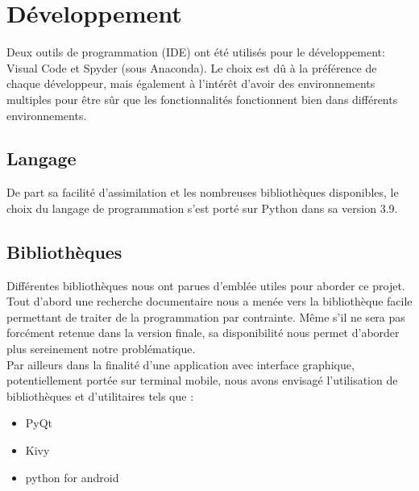 \section{Développement}

Deux outils de programmation (IDE) ont été utilisés pour le développement: Visual Code et Spyder 
(sous Anaconda). Le choix est dû à la préférence de chaque développeur, mais également à l'intérêt 
d’avoir des environnements multiples pour être sûr que les fonctionnalités fonctionnent bien dans différents 
environnements.


\subsection{Langage}

De part sa facilité d'assimilation et les nombreuses bibliothèques disponibles, le choix du langage de programmation
s'est porté sur Python dans sa version 3.9.

\subsection{Bibliothèques}

Différentes bibliothèques nous ont parues d'emblée utiles pour aborder ce projet. Tout d'abord
une recherche documentaire nous a menée vers la bibliothèque \textsf{facile} permettant de traiter
de la programmation par contrainte. Même s'il ne sera pas forcément retenue dans la version finale, 
sa disponibilité nous permet d'aborder plus sereinement notre problématique.\\

Par ailleurs dans la finalité d'une application avec interface graphique, potentiellement portée sur terminal mobile,
 nous avons envisagé l'utilisation de bibliothèques et d'utilitaires tels que :

 \begin{itemize}
     \item \textsf{PyQt}
     \item \textsf{Kivy}
     \item \textsf{python for android}
 \end{itemize}